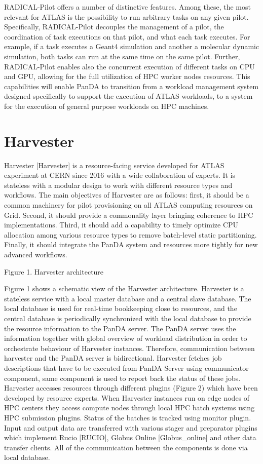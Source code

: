 \documentclass{webofc}
\begin{document}
RADICAL-Pilot offers a number of distinctive features. Among these, the most relevant for ATLAS is the possibility to run arbitrary tasks on any given pilot. Specifically, RADICAL-Pilot decouples the management of a pilot, the coordination of task executions on that pilot, and what each task executes. For example, if a task executes a Geant4 simulation and another a molecular dynamic simulation, both tasks can run at the same time on the same pilot. Further, RADICAL-Pilot enables also the concurrent execution of different tasks on CPU and GPU, allowing for the full utilization of HPC worker nodes resources. This capabilities will enable PanDA to transition from a workload management system designed specifically to support the execution of ATLAS workloads, to a system for the execution of general purpose workloads on HPC machines.

\section{Harvester}

Harvester [Harvester] is a resource-facing service developed for ATLAS experiment at CERN since 2016 with a wide collaboration of experts.  It is stateless with a modular design to work with different resource types and workflows. The main objectives of Harvester are as follows: first, it should be a common machinery for pilot provisioning on all ATLAS computing resources on Grid. Second, it should provide a commonality layer bringing coherence to HPC implementations. Third, it should add a capability to timely optimize CPU allocation among various resource types to remove batch-level static partitioning. Finally, it should integrate the PanDA system and resources more tightly for new advanced workflows.

Figure 1. Harvester architecture

Figure 1 shows a schematic view of the Harvester architecture. Harvester is a stateless service with a local master database and a central slave database. The local database is used for real-time bookkeeping close to resources, and the central database is periodically synchronized with the local database to provide the resource information to the PanDA server. The PanDA server uses the information together with global overview of workload distribution in order to orchestrate behaviour of Harvester instances. Therefore, communication between harvester and the PanDA server is bidirectional. Harvester fetches job descriptions that have to be executed from PanDA Server using communicator component, same component is used to report back the status of these jobs. Harvester accesses resources through different plugins (Figure 2) which have been developed by resource experts. When Harvester instances run on edge nodes of HPC centers they access compute nodes through local HPC batch systems using HPC submission plugins. Status of the batches is tracked using monitor plugin. Input and output data are transferred with various stager and preparator plugins which implement Rucio [RUCIO], Globus Online [Globus_online]  and other data transfer clients. All of the communication between the components is done via local database.
\end{document}
